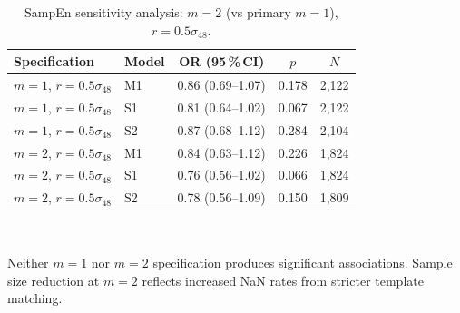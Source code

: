 \documentclass[12pt,a4paper]{article}
\begin{document}
\begin{table}[htbp]
  \centering
  \caption{SampEn sensitivity analysis: $m=2$ (vs primary $m=1$),
  $r=0.5\sigma_{48}$.}
  \label{tab:sampenm2}
  \small
  \begin{tabular}{llccc}
    \toprule
    \textbf{Specification} & \textbf{Model} & \textbf{OR (95\,\%\,CI)} & \textbf{$p$} & \textbf{$N$} \\
    \midrule
    $m=1$, $r=0.5\sigma_{48}$ & M1 & 0.86 (0.69--1.07) & 0.178 & 2{,}122 \\
    $m=1$, $r=0.5\sigma_{48}$ & S1 & 0.81 (0.64--1.02) & 0.067 & 2{,}122 \\
    $m=1$, $r=0.5\sigma_{48}$ & S2 & 0.87 (0.68--1.12) & 0.284 & 2{,}104 \\
    \midrule
    $m=2$, $r=0.5\sigma_{48}$ & M1 & 0.84 (0.63--1.12) & 0.226 & 1{,}824 \\
    $m=2$, $r=0.5\sigma_{48}$ & S1 & 0.76 (0.56--1.02) & 0.066 & 1{,}824 \\
    $m=2$, $r=0.5\sigma_{48}$ & S2 & 0.78 (0.56--1.09) & 0.150 & 1{,}809 \\
    \bottomrule
  \end{tabular}
  \vspace{2pt}\\
  \raggedright\footnotesize
  Neither $m=1$ nor $m=2$ specification produces significant associations.
  Sample size reduction at $m=2$ reflects increased NaN rates from
  stricter template matching.
\end{table}
\end{document}
